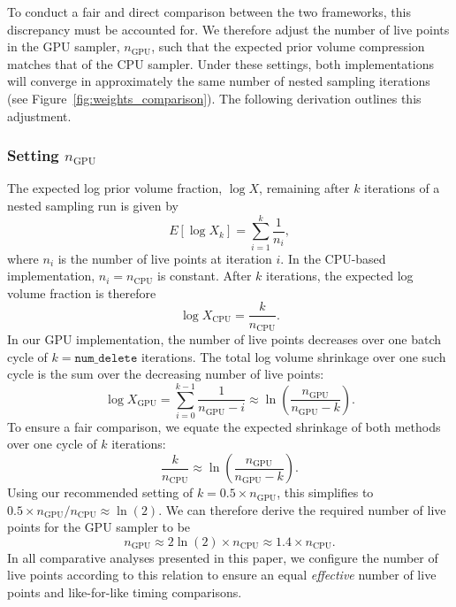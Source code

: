 \documentclass[fleqn,usenatbib]{mnras}
\begin{document}
To conduct a fair and direct comparison between the two frameworks, this
discrepancy must be accounted for. We therefore adjust the number of
live points in the GPU sampler, $n_{\text{GPU}}$, such that the
expected prior volume compression matches that of the CPU sampler. 
Under these settings, both implementations will converge in
approximately the same number of nested sampling iterations (see Figure~\ref{fig:weights_comparison}). 
The following derivation outlines this adjustment.


\subsubsection{Setting $n_{\text{GPU}}$}
\label{sec:setting_n_gpu}

The expected log prior volume fraction, $\log X$, remaining after $k$ iterations
of a nested sampling run is given by~\citep{skilling, dynamic_ns, aeons}
\begin{equation}
    E[\log X_k] = \sum_{i=1}^{k} \frac{1}{n_i},
\end{equation}
where $n_i$ is the number of live points at iteration $i$. In the
CPU-based implementation, $n_i = n_{\text{CPU}}$ is constant.
After $k$ iterations, the expected log volume fraction is therefore
\begin{equation}
    \log X_{\text{CPU}} = \frac{k}{n_{\text{CPU}}}.
\end{equation}
In our GPU implementation, the number of live points decreases over one
batch cycle of $k = \texttt{num\_delete}$ iterations. The total log
volume shrinkage over one such cycle is the sum over the decreasing
number of live points:
\begin{equation}
    \log X_{\text{GPU}} = \sum_{i=0}^{k-1} \frac{1}{n_{\text{GPU}}-i} \approx \ln\left(\frac{n_{\text{GPU}}}{n_{\text{GPU}}-k}\right).
\end{equation}
To ensure a fair comparison, we equate the expected shrinkage of both
methods over one cycle of $k$ iterations:
\begin{equation}
    \frac{k}{n_{\text{CPU}}} \approx \ln\left(\frac{n_{\text{GPU}}}{n_{\text{GPU}}-k}\right).
\end{equation}
Using our recommended setting of $k = 0.5 \times n_{\text{GPU}}$, this
simplifies to $0.5 \times n_{\text{GPU}} / n_{\text{CPU}} \approx \ln(2)$.
We can therefore derive the required number of live points for the GPU
sampler to be
\begin{equation}
    n_{\text{GPU}} \approx 2 \ln(2) \times n_{\text{CPU}} \approx 1.4 \times n_{\text{CPU}}.
\end{equation}
In all comparative analyses presented in this paper, we configure the
number of live points according to this relation to ensure an equal 
\textit{effective} number of live points and
like-for-like timing comparisons.
\end{document}
